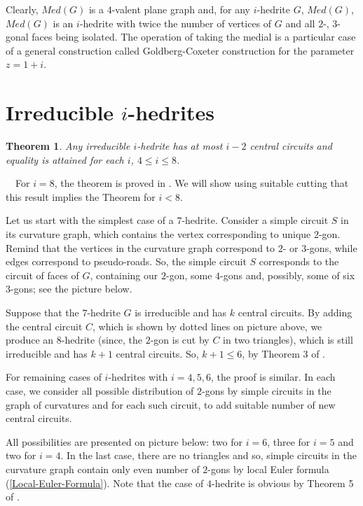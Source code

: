 \documentclass[12pt]{article}
\newtheorem{theor}{Theorem}
\newcommand{\proof}{\noindent{\bf Proof.}\ \ }
\begin{document}
Clearly, $Med(G)$ is a $4$-valent plane graph and, for any $i$-hedrite $G$, $Med(G)$, $Med(G)$ is an $i$-hedrite with twice the number of vertices of $G$ and all $2$-, $3$-gonal faces being isolated. The operation of taking the medial is a particular case of a general construction called Goldberg-Coxeter construction for the parameter $z=1+i$.



\section{Irreducible $i$-hedrites}



\begin{theor}\label{irre}
Any irreducible $i$-hedrite has at most $i-2$ central circuits and equality is attained for each $i$, $4\leq i\leq 8$.
\end{theor}
\proof For $i=8$, the theorem is proved in \cite{DSt}. We will show using suitable cutting that this result implies the Theorem for $i<8$.

Let us start with the simplest case of a $7$-hedrite. Consider a simple circuit $S$ in its curvature graph, which contains the vertex corresponding to unique $2$-gon. Remind that the vertices in the curvature graph correspond to $2$- or $3$-gons, while edges correspond to pseudo-roads. So, the simple circuit $S$ corresponds to the circuit of faces of $G$, containing our $2$-gon, some $4$-gons and, possibly, some of six $3$-gons; see the picture below.


\begin{center}
\epsfxsize=40mm
\end{center}






Suppose that the $7$-hedrite $G$ is irreducible and has $k$ central circuits. By adding the central circuit $C$, which is shown by dotted lines on picture above, we produce an $8$-hedrite (since, the $2$-gon is cut by $C$ in two triangles), which is still irreducible and has $k+1$ central circuits. So, $k+1\leq 6$, by Theorem 3 of \cite{DSt}.


For remaining cases of $i$-hedrites with $i=4,5,6$, the proof is similar. In each case, we consider all possible distribution of $2$-gons by simple circuits in the graph of curvatures and for each such circuit, to add suitable number of new central circuits. 


All possibilities are presented on picture below: two for $i=6$, three for $i=5$ and two for $i=4$. In the last case, there are no triangles and so, simple circuits in the curvature graph contain only even number of $2$-gons by local Euler formula (\ref{Local-Euler-Formula}). Note that the case of $4$-hedrite is obvious by Theorem 5 of \cite{DSt}.
\end{document}

